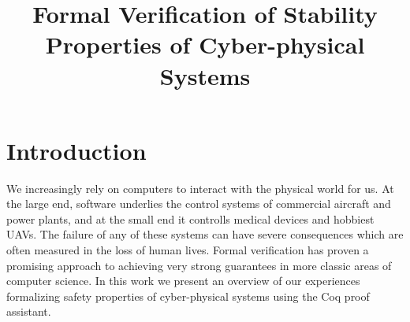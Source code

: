 \documentclass[preprint]{sigplanconf}
\begin{document}
\setlength{\pdfpageheight}{\paperheight}
\setlength{\pdfpagewidth}{\paperwidth}





\titlebanner{}        %
\preprintfooter{}   %

\title{Formal Verification of Stability Properties of Cyber-physical Systems}

\authorinfo{}
           {}
           {}
\authorinfo{}
           {}
           {}

\maketitle





\section{Introduction}          %

We increasingly rely on computers to interact with the physical world for us.
At the large end, software underlies the control systems of commercial aircraft and power plants, and at the small end it controlls medical devices and hobbiest UAVs.
The failure of any of these systems can have severe consequences which are often measured in the loss of human lives.
Formal verification has proven a promising approach to achieving very strong guarantees in more classic areas of computer science.
In this work we present an overview of our experiences formalizing safety properties of cyber-physical systems using the Coq proof assistant.
\end{document}
